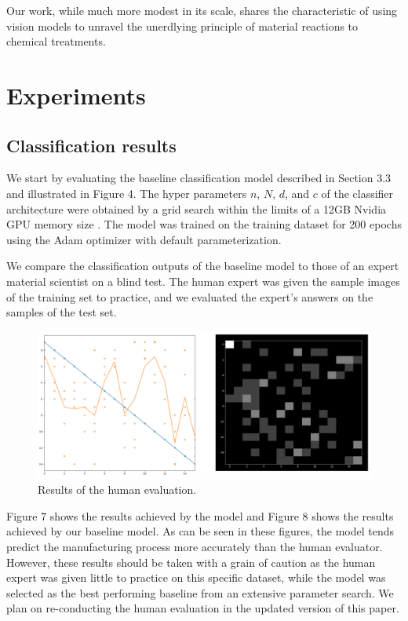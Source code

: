 \documentclass[10pt,twocolumn,letterpaper]{article}
\begin{document}
Our work, while much more modest in its scale, 
shares the characteristic of using vision models to unravel
the unerdlying principle of material reactions to chemical treatments.

\section{Experiments}

\subsection{Classification results}
% 
We start by evaluating the baseline classification model described in Section 3.3 and illustrated in Figure 4.
The hyper parameters $n$, $N$, $d$, and $c$ of the classifier architecture 
were obtained by a grid search within the limits of a 12GB Nvidia GPU memory size .
The model was trained on the training dataset for 200 epochs using the Adam optimizer with default parameterization.

We compare the classification outputs of the baseline model to those 
of an expert material scientist on a blind test.
The human expert was given the sample images of the training set to practice,
and we evaluated the expert's answers on the samples of the test set.

\begin{figure}[h]
	\centering
	\includegraphics[width=0.9\linewidth]{"./figures/Figure7"}
	\caption{
		Results of the human evaluation.
	}
\end{figure}

Figure 7 shows the results achieved by the model and Figure 8 shows the results achieved by our baseline model.
As can be seen in these figures, the model tends predict the manufacturing 
process more accurately than the human evaluator.
However, these results should be taken with a grain of caution 
as the human expert was given little to practice on this specific dataset,
while the model was selected as the best performing baseline from an extensive parameter search.
We plan on re-conducting the human evaluation in the updated version of this paper.
\end{document}

